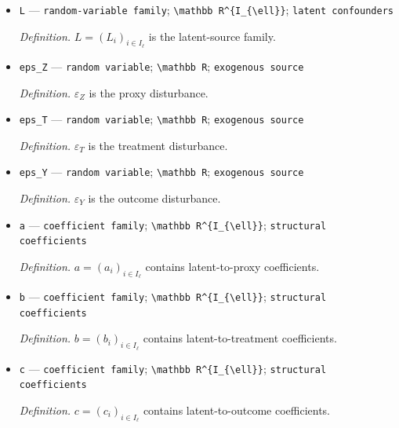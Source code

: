 \documentclass{article}
\begin{document}
\begin{itemize}
  \item \texttt{L} --- \texttt{random-\allowbreak{}variable family}; \texttt{\textbackslash{}\allowbreak{}mathbb R\textasciicircum{}\{I\_\allowbreak{}\{\textbackslash{}\allowbreak{}ell\}\allowbreak{}\}\allowbreak{}}; \texttt{latent confounders}
  \par\smallskip\noindent\emph{Definition.} \(L=(L_i)_{i\in I_{\ell}}\) is the latent-source family.
  \item \texttt{eps\_\allowbreak{}Z} --- \texttt{random variable}; \texttt{\textbackslash{}\allowbreak{}mathbb R}; \texttt{exogenous source}
  \par\smallskip\noindent\emph{Definition.} \(\varepsilon_Z\) is the proxy disturbance.
  \item \texttt{eps\_\allowbreak{}T} --- \texttt{random variable}; \texttt{\textbackslash{}\allowbreak{}mathbb R}; \texttt{exogenous source}
  \par\smallskip\noindent\emph{Definition.} \(\varepsilon_T\) is the treatment disturbance.
  \item \texttt{eps\_\allowbreak{}Y} --- \texttt{random variable}; \texttt{\textbackslash{}\allowbreak{}mathbb R}; \texttt{exogenous source}
  \par\smallskip\noindent\emph{Definition.} \(\varepsilon_Y\) is the outcome disturbance.
  \item \texttt{a} --- \texttt{coefficient family}; \texttt{\textbackslash{}\allowbreak{}mathbb R\textasciicircum{}\{I\_\allowbreak{}\{\textbackslash{}\allowbreak{}ell\}\allowbreak{}\}\allowbreak{}}; \texttt{structural coefficients}
  \par\smallskip\noindent\emph{Definition.} \(a=(a_i)_{i\in I_{\ell}}\) contains latent-to-proxy coefficients.
  \item \texttt{b} --- \texttt{coefficient family}; \texttt{\textbackslash{}\allowbreak{}mathbb R\textasciicircum{}\{I\_\allowbreak{}\{\textbackslash{}\allowbreak{}ell\}\allowbreak{}\}\allowbreak{}}; \texttt{structural coefficients}
  \par\smallskip\noindent\emph{Definition.} \(b=(b_i)_{i\in I_{\ell}}\) contains latent-to-treatment coefficients.
  \item \texttt{c} --- \texttt{coefficient family}; \texttt{\textbackslash{}\allowbreak{}mathbb R\textasciicircum{}\{I\_\allowbreak{}\{\textbackslash{}\allowbreak{}ell\}\allowbreak{}\}\allowbreak{}}; \texttt{structural coefficients}
  \par\smallskip\noindent\emph{Definition.} \(c=(c_i)_{i\in I_{\ell}}\) contains latent-to-outcome coefficients.

\end{itemize}
\end{document}
